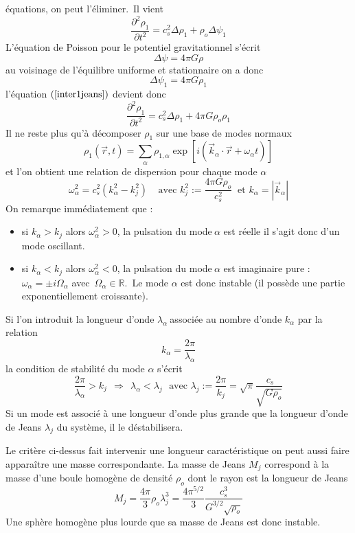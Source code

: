 \'{e}quations, on peut l'\'{e}liminer.\ Il vient%
\begin{equation}
\dfrac{\partial^{2}\rho_{1}}{\partial t^{2}}=c_{s}^{2}\Delta\rho_{1}+\rho
_{o}\Delta\psi_{1}\label{inter1jeans}%
\end{equation}
L'\'{e}quation de Poisson pour le potentiel gravitationnel s'\'{e}crit%
\[
\Delta\psi=4\pi G\rho
\]
au voisinage de l'\'{e}quilibre uniforme et stationnaire on a donc%
\[
\Delta\psi_{1}=4\pi G\rho_{1}%
\]
l'\'{e}quation $\left(  \ref{inter1jeans}\right)  $ devient donc%
\[
\dfrac{\partial^{2}\rho_{1}}{\partial t^{2}}=c_{s}^{2}\Delta\rho_{1}+4\pi
G\rho_{o}\rho_{1}%
\]
Il ne reste plus qu'\`{a} d\'{e}composer $\rho_{1}$ sur une base de modes
normaux%
\[
\rho_{1}\left(  \vec{r},t\right)  =\sum_{\alpha}\rho_{1,\alpha}\exp\left[
i\left(  \vec{k}_{\alpha}\cdot\vec{r}+\omega_{\alpha}t\right)  \right]
\]
et l'on obtient une relation de dispersion pour chaque mode $\alpha$%
\[
\omega_{\alpha}^{2}=c_{s}^{2}\left(  k_{\alpha}^{2}-k_{j}^{2}\right)
\ \ \ \ \ \text{avec }k_{j}^{2}:=\frac{4\pi G\rho_{o}}{c_{s}^{2}}\ \text{\ et
\ }k_{\alpha}=\left\vert \vec{k}_{\alpha}\right\vert
\]
On remarque imm\'{e}diatement que :

\begin{itemize}
\item si $k_{\alpha}>k_{j}$ alors $\omega_{\alpha}^{2}>0$, la pulsation du
mode$\ \alpha$ est r\'{e}elle il s'agit donc d'un mode oscillant.

\item si $k_{\alpha}<k_{j}$ alors $\omega_{\alpha}^{2}<0$, la pulsation du
mode$\ \alpha$ est imaginaire pure : $\omega_{\alpha}=\pm i\Omega_{\alpha}$
avec\ $\Omega_{\alpha}\in\mathbb{R}$.\ Le mode $\alpha$ est donc instable (il
poss\`{e}de une partie exponentiellement croissante).
\end{itemize}

Si l'on introduit la longueur d'onde $\lambda_{\alpha}\ $associ\'{e}e au
nombre d'onde $k_{\alpha}$ par la relation%
\[
k_{\alpha}=\frac{2\pi}{\lambda_{\alpha}}
\]
la condition de stabilit\'{e} du mode $\alpha$ s'\'{e}crit
\[
\frac{2\pi}{\lambda_{\alpha}}>k_{j}\ \ \Rightarrow\ \ \lambda_{\alpha}%
<\lambda_{j}\ \ \ \text{avec\ \ }\lambda_{j}:=\frac{2\pi}{k_{j}}=\sqrt{\pi
}\frac{\ c_{s}}{\sqrt{G\rho_{o}}}
\]
Si un mode est associ\'{e} \`{a} une longueur d'onde plus grande que la
longueur d'onde de Jeans $\lambda_{j}$ du syst\`{e}me, il le
d\'{e}stabilisera.

Le critère ci-dessus fait intervenir une longueur caractéristique on peut aussi faire apparaître une masse correspondante. La masse de Jeans $M_j$ correspond à la masse d'une boule homogène de densité $\rho_o$ dont le rayon est la longueur de Jeans
 \begin{equation}
 M_j = \frac{4\pi}{3}\rho_{o} \lambda_{j}^3 =  \frac{4\pi^{5/2}}{3} \frac{c_{s}^3}{G^{3/2}\sqrt{\rho_{o}}}
 \end{equation}
Une sphère homogène plus lourde que sa masse de Jeans est donc instable.

